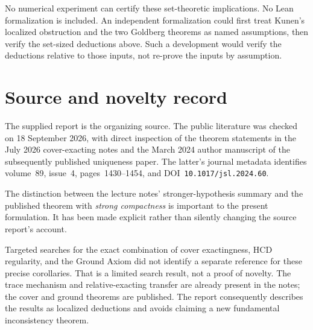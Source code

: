 \documentclass[11pt,letterpaper]{article}
\theoremstyle{definition}
\newcommand{\HCD}{\mathrm{HCD}}
\begin{document}
No numerical experiment can certify these set-theoretic implications. No Lean formalization is included. An independent formalization could first treat Kunen's localized obstruction and the two Goldberg theorems as named assumptions, then verify the set-sized deductions above. Such a development would verify the deductions relative to those inputs, not re-prove the inputs by assumption.

\section{Source and novelty record}\label{app:sources}

The supplied report is the organizing source. The public literature was checked on 18 September 2026, with direct inspection of the theorem statements in the July 2026 cover-exacting notes and the March 2024 author manuscript of the subsequently published uniqueness paper. The latter's journal metadata identifies volume~89, issue~4, pages~1430--1454, and DOI~\texttt{10.1017/jsl.2024.60}.\cite{uniqueness}

The distinction between the lecture notes' stronger-hypothesis summary and the published theorem with \emph{strong compactness} is important to the present formulation. It has been made explicit rather than silently changing the source report's account.

Targeted searches for the exact combination of cover exactingness, $\HCD$ regularity, and the Ground Axiom did not identify a separate reference for these precise corollaries. That is a limited search result, not a proof of novelty. The trace mechanism and relative-exacting transfer are already present in the notes; the cover and ground theorems are published. The report consequently describes the results as localized deductions and avoids claiming a new fundamental inconsistency theorem.
\end{document}
